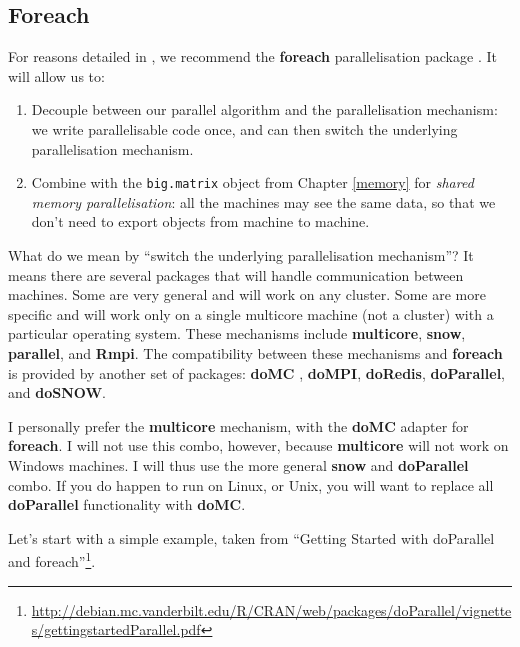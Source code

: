 \documentclass[]{book}
\newenvironment{Shaded}{\begin{snugshade}}{\end{snugshade}}
\newcommand{\DataTypeTok}[1]{\textcolor[rgb]{0.13,0.29,0.53}{#1}}
\newcommand{\DecValTok}[1]{\textcolor[rgb]{0.00,0.00,0.81}{#1}}
\newcommand{\KeywordTok}[1]{\textcolor[rgb]{0.13,0.29,0.53}{\textbf{#1}}}
\newcommand{\NormalTok}[1]{#1}
\newcommand{\OperatorTok}[1]{\textcolor[rgb]{0.81,0.36,0.00}{\textbf{#1}}}
\newcommand{\StringTok}[1]{\textcolor[rgb]{0.31,0.60,0.02}{#1}}
\renewcommand{\href}[2]{#2\footnote{\url{#1}}}
\theoremstyle{definition}
\theoremstyle{definition}
\theoremstyle{definition}
\theoremstyle{remark}
\let\BeginKnitrBlock\begin \let\EndKnitrBlock\end
\begin{document}
\hypertarget{foreach}{%
\subsection{Foreach}\label{foreach}}

For reasons detailed in \citet{kane2013scalable}, we recommend the \textbf{foreach} parallelisation package \citep{foreach}.
It will allow us to:

\begin{enumerate}
\def\labelenumi{\arabic{enumi}.}
\item
  Decouple between our parallel algorithm and the parallelisation mechanism: we write parallelisable code once, and can then switch the underlying parallelisation mechanism.
\item
  Combine with the \texttt{big.matrix} object from Chapter \ref{memory} for \emph{shared memory parallelisation}: all the machines may see the same data, so that we don't need to export objects from machine to machine.
\end{enumerate}

What do we mean by ``switch the underlying parallelisation mechanism''?
It means there are several packages that will handle communication between machines.
Some are very general and will work on any cluster.
Some are more specific and will work only on a single multicore machine (not a cluster) with a particular operating system.
These mechanisms include \textbf{multicore}, \textbf{snow}, \textbf{parallel}, and \textbf{Rmpi}.
The compatibility between these mechanisms and \textbf{foreach} is provided by another set of packages:
\textbf{doMC} , \textbf{doMPI}, \textbf{doRedis}, \textbf{doParallel}, and \textbf{doSNOW}.

\BeginKnitrBlock{remark}
{}I personally prefer the \textbf{multicore} mechanism, with the \textbf{doMC} adapter for \textbf{foreach}.
I will not use this combo, however, because \textbf{multicore} will not work on Windows machines.
I will thus use the more general \textbf{snow} and \textbf{doParallel} combo.
If you do happen to run on Linux, or Unix, you will want to replace all \textbf{doParallel} functionality with \textbf{doMC}.
\EndKnitrBlock{remark}

Let's start with a simple example, taken from \href{http://debian.mc.vanderbilt.edu/R/CRAN/web/packages/doParallel/vignettes/gettingstartedParallel.pdf}{``Getting Started with doParallel and foreach''}.

\begin{Shaded}
\end{Shaded}
\end{document}
